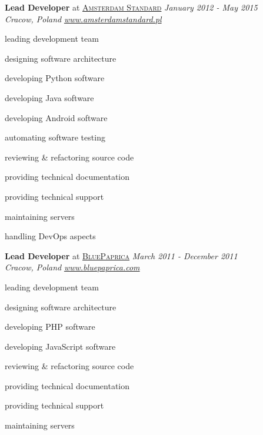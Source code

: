 \documentclass[10pt]{article}
\newenvironment{innerlist}[1][\enskip\textbullet]%
        {\begin{compactitem}[#1]}{\end{compactitem}}
\begin{document}
\textbf{Lead Developer} at \href{http://amsterdamstandard.pl/}{\textsc{Amsterdam Standard}} 
\hfill \textit{January 2012 - May 2015} \\
\textit{Cracow, Poland}
 \hfill \href{http://amsterdamstandard.pl/}{\textit{www.amsterdamstandard.pl}} 
 \vspace{0.1in}
\begin{innerlist}
\item leading development team
\item designing software architecture
\item developing Python software
\item developing Java software
\item developing Android software
\item automating software testing
\item reviewing \& refactoring source code
\item providing technical documentation 
\item providing technical support
\item maintaining servers
\item handling DevOps aspects
\end{innerlist}

\vspace{0.30in}

\textbf{Lead Developer} at \href{http://www.bluepaprica.com/}{\textsc{BluePaprica}} 
\hfill \textit{March 2011 - December 2011} \\
\textit{Cracow, Poland} 
\hfill \href{http://www.bluepaprica.com/}{\textit{www.bluepaprica.com}} 
\vspace{0.1in}
\begin{innerlist}
\item leading development team
\item designing software architecture
\item developing PHP software
\item developing JavaScript software
\item reviewing \& refactoring source code
\item providing technical documentation 
\item providing technical support
\item maintaining servers
\end{innerlist}

\vspace{0.30in}
\end{document}
